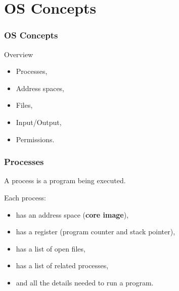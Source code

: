 \section{OS Concepts}
  \begin{frame}
    \frametitle{OS Concepts}
        \begin{block}{Overview}
          \begin{itemize}
            \item Processes,
            \item Address spaces,
            \item Files,
            \item Input/Output,
            \item Permissions.
          \end{itemize}
        \end{block}
  \end{frame}

  \begin{frame}
    \frametitle{Processes}
    A process is a program being executed.
    \begin{block}{Each process:}
      \begin{itemize}
        \item has an address space (\textbf{core image}),
        \item has a register (program counter and stack pointer),
        \item has a list of open files,
        \item has a list of related processes,
        \item and all the details needed to run a program.
      \end{itemize}
    \end{block}
  \end{frame}

